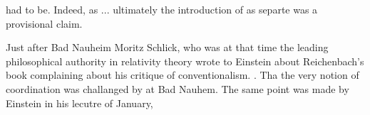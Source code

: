\documentclass[draft]{article}
\begin{document}
{had to be. Indeed, as ... ultimately the introduction of \rac as separte was a provisional claim. 

Just after Bad Nauheim Moritz Schlick, who was at that time the leading philosophical authority in relativity theory wrote to Einstein about Reichenbach's book complaining about his critique of conventionalism. . Tha the very notion of coordination was challanged by at Bad Nauhem. The same point was made by Einstein in his lecutre of January, 



%

%


}
\end{document}
